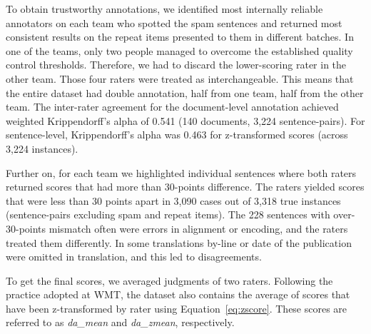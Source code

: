 To obtain trustworthy annotations, we identified most internally reliable annotators on each team who spotted the spam sentences and returned most consistent results on the repeat items presented to them in different batches. In one of the teams, only two people managed to overcome the established quality control thresholds. Therefore, we had to discard the lower-scoring rater in the other team. Those four raters were treated as interchangeable. This means that the entire dataset had double annotation, half from one team, half from the other team.
The inter-rater agreement for the document-level annotation achieved weighted Krippendorff's alpha of 0.541 (140 documents, 3,224 sentence-pairs).
For sentence-level, Krippendorff's alpha was 0.463 for z-transformed scores (across 3,224 instances). %

Further on, for each team we highlighted individual sentences where both raters returned scores that had more than 30-points difference. 
The raters yielded scores that were less than 30 points apart in 3,090 cases out of 3,318 true instances (sentence-pairs excluding spam and repeat items).
The 228 sentences with over-30-points mismatch often were errors in alignment or encoding, and the raters treated them differently. In some translations by-line or date of the publication were omitted in translation, and this led to disagreements. 

\label{pg:final_da}
To get the final scores, we averaged judgments of two raters. Following the practice adopted at \gls{WMT}, the dataset also contains the average of scores that have been z-transformed by rater using Equation~\ref{eq:zscore}. These scores are referred to as \textit{da\_mean} and \textit{da\_zmean}, respectively.

